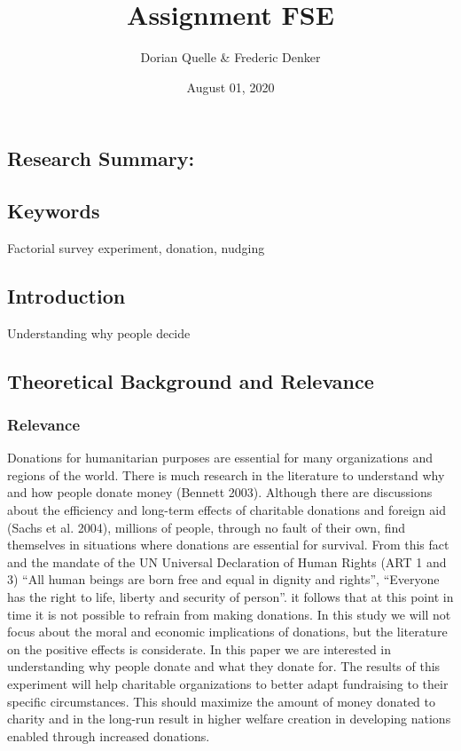 \documentclass[
  12pt,
]{article}
\title{Assignment FSE}
\author{Dorian Quelle \& Frederic Denker}
\date{August 01, 2020}
\begin{document}
\maketitle

\hypertarget{research-summary}{%
\subsection{Research Summary:}\label{research-summary}}

\hypertarget{keywords}{%
\subsection{Keywords}\label{keywords}}

Factorial survey experiment, donation, nudging

\newpage

\hypertarget{introduction}{%
\subsection{Introduction}\label{introduction}}

Understanding why people decide

\hypertarget{theoretical-background-and-relevance}{%
\subsection{Theoretical Background and
Relevance}\label{theoretical-background-and-relevance}}

\hypertarget{relevance}{%
\subsubsection{Relevance}\label{relevance}}

Donations for humanitarian purposes are essential for many organizations
and regions of the world. There is much research in the literature to
understand why and how people donate money (Bennett 2003). Although
there are discussions about the efficiency and long-term effects of
charitable donations and foreign aid (Sachs et al. 2004), millions of
people, through no fault of their own, find themselves in situations
where donations are essential for survival. From this fact and the
mandate of the UN Universal Declaration of Human Rights (ART 1 and 3)
``All human beings are born free and equal in dignity and rights'',
``Everyone has the right to life, liberty and security of person''. it
follows that at this point in time it is not possible to refrain from
making donations. In this study we will not focus about the moral and
economic implications of donations, but the literature on the positive
effects is considerate. In this paper we are interested in understanding
why people donate and what they donate for. The results of this
experiment will help charitable organizations to better adapt
fundraising to their specific circumstances. This should maximize the
amount of money donated to charity and in the long-run result in higher
welfare creation in developing nations enabled through increased
donations.
\end{document}
